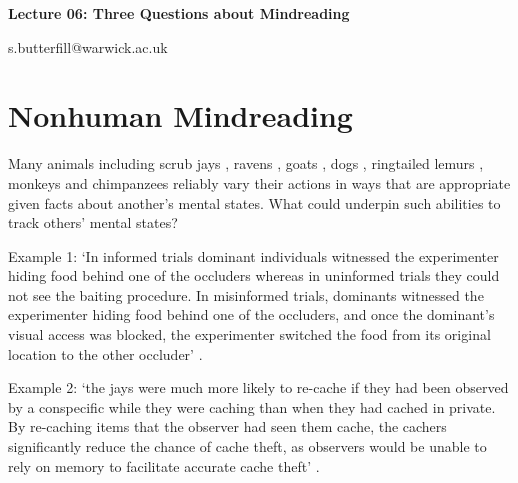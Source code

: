 \documentclass[12pt]{extarticle}
\date{}
\makeatletter
\def \ititle {Origins of Mind}
\def \iemail{s.butterfill@warwick.ac.uk}
\makeatother
\begin{document}
\begin{multicols*}{3}

\setlength\footnotesep{1em}









\def \ititle {Lecture 06: Three Questions about Mindreading}

\begin{center}

{\Large

\textbf{\ititle}

}



\iemail %

\end{center}



\section{Nonhuman Mindreading}


Many animals including scrub jays \citep{Clayton:2007fh},
ravens \citep{bugnyar:2016_ravens},
goats \citep{kaminski:2006_goats},
dogs \citep{kaminski:2009_domestic},
ringtailed lemurs \citep{sandel:2011_evidence},
monkeys \citep{burkart:2007_understanding, hattori:2009_tufted}
and chimpanzees \citep{melis:2006_chimpanzees,karg:2015_chimpanzees,krupenye:2016_great} reliably vary their actions in ways that are appropriate given facts about another’s mental states.
What could underpin such abilities to track others’ mental states?

Example 1: ‘In informed trials dominant individuals witnessed the experimenter hiding
food behind one of the occluders whereas in uninformed trials they could
not see the baiting procedure. In misinformed trials, dominants witnessed
the experimenter hiding food behind one of the occluders, and once the
dominant’s visual access was blocked, the experimenter switched the food
from its original location to the other occluder’ \citep{Hare:2001ph}.

Example 2: ‘the jays were much more likely to re-cache if they had been observed by a conspecific while they
were caching than when they had cached in private. By re-caching items that the observer had seen
them cache, the cachers significantly reduce the chance of cache theft, as observers would be unable
to rely on memory to facilitate accurate cache theft’ \citep[p.~516]{Clayton:2007fh}.


\end{multicols*}
\end{document}

